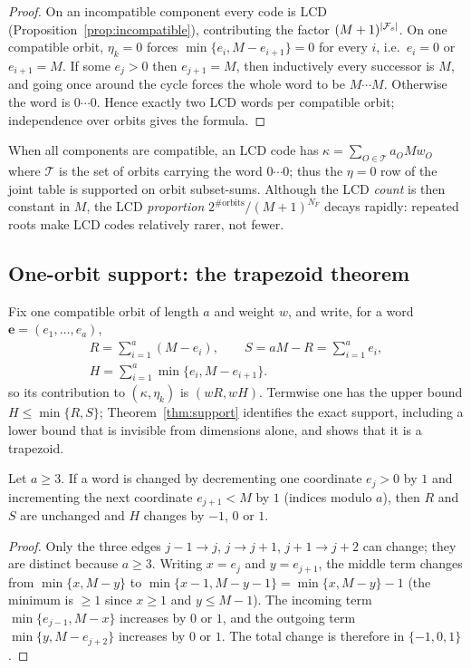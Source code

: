\begin{proof}
On an incompatible component every code is LCD
(Proposition~\ref{prop:incompatible}), contributing the factor
$(M+1)^{|\mathcal F_s|}$.  On one compatible orbit, $\eta_k=0$ forces
$\min\{e_i,M-e_{i+1}\}=0$ for every $i$, i.e.\ $e_i=0$ or $e_{i+1}=M$.
If some $e_j>0$ then $e_{j+1}=M$, then inductively every successor is $M$, and
going once around the cycle forces the whole word to be $M\cdots M$.
Otherwise the word is $0\cdots0$.  Hence exactly two LCD words per compatible
orbit; independence over orbits gives the formula.
\end{proof}

When all components are compatible, an LCD code has
$\kappa=\sum_{O\in\mathcal{T}}a_OMw_O$ where $\mathcal{T}$ is the set of orbits
carrying the word $0\cdots0$; thus the $\eta=0$ row of the joint table is
supported on orbit subset-sums.  Although the LCD \emph{count} is then constant
in $M$, the LCD \emph{proportion} $2^{\#\mathrm{orbits}}/(M+1)^{N_F}$ decays
rapidly: repeated roots make LCD codes relatively rarer, not fewer.

\subsection{One-orbit support: the trapezoid theorem}\label{sec:support}

Fix one compatible orbit of length $a$ and weight $w$, and write, for a word
$\mathbf{e}=(e_1,\ldots,e_a)$,
\[
\begin{gathered}
R=\sum_{i=1}^{a}(M-e_i),\qquad
S=aM-R=\sum_{i=1}^{a}e_i,\\[6pt]
H=\sum_{i=1}^{a}\min\{e_i,M-e_{i+1}\}.
\end{gathered}
\]
so its contribution to $(\kappa,\eta_k)$ is $(wR,wH)$.  Termwise one has the
upper bound $H\leq\min\{R,S\}$; Theorem~\ref{thm:support} identifies the
exact support, including a lower bound that is invisible from dimensions
alone, and shows that it is a trapezoid.

\begin{lemma}\label{lem:transfer-step}
Let $a\geq3$.  If a word is changed by decrementing one coordinate $e_j>0$ by
$1$ and incrementing the next coordinate $e_{j+1}<M$ by $1$ (indices modulo
$a$), then $R$ and $S$ are unchanged and $H$ changes by $-1$, $0$ or $1$.
\end{lemma}

\begin{proof}
Only the three edges $j-1\to j$, $j\to j+1$, $j+1\to j+2$ can change; they are
distinct because $a\geq3$.  Writing $x=e_j$ and $y=e_{j+1}$, the middle term
changes from $\min\{x,M-y\}$ to $\min\{x-1,M-y-1\}=\min\{x,M-y\}-1$ (the
minimum is $\geq1$ since $x\geq1$ and $y\leq M-1$).  The incoming term
$\min\{e_{j-1},M-x\}$ increases by $0$ or $1$, and the outgoing term
$\min\{y,M-e_{j+2}\}$ increases by $0$ or $1$.  The total change is therefore
in $\{-1,0,1\}$.
\end{proof}

